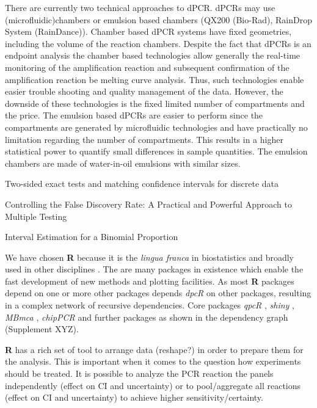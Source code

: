 \documentclass[a4,center,fleqn]{NAR}
\begin{document}
There are currently two technical approaches to dPCR. dPCRs may use		%
(microfluidic)chambers or emulsion based chambers 
(QX200 \texttrademark (Bio-Rad), RainDrop \texttrademark System (RainDance)). 
Chamber based dPCR systems have fixed geometries, including the volume of the 
reaction chambers. Despite the fact that dPCRs is an endpoint analysis the 
chamber based technologies allow generally the real-time monitoring of the 
amplification reaction and subsequent confirmation of the amplification reaction 
be melting curve analysis. Thus, such technologies enable easier trouble 
shooting and quality management of the data. However, the downside of these 
technologies is the fixed limited number of compartments and the price. The 
emulsion based dPCRs are easier to perform since the compartments are generated 
by microfluidic technologies and have practically no limitation regarding the 
number of compartments. This results in a higher statistical power to quantify 
small differences in sample quantities. The emulsion chambers are made of 
water-in-oil emulsions with similar sizes.


Two-sided exact tests and matching confidence intervals for discrete data \cite{fay_2010}

Controlling the False Discovery Rate: A Practical and Powerful Approach to Multiple Testing \cite{benjamini_1995}

Interval Estimation for a Binomial Proportion \cite{brown_2001}



We have chosen \textbf{R} because it is the \textit{lingua franca} in 
biostatistics and broadly used in other disciplines \cite{rodiger_r_2015}. The 
are many packages in existence which enable the fast development of new methods 
and plotting facilities. As most \textbf{R} packages depend on one or more other 
packages \cite{ooms_2013} depends \textit{dpcR} on other packages, resulting in 
a complex network of recursive dependencies. Core packages \textit{qpcR} 
\cite{ritz_qpcr_2008}, \textit{shiny} \cite{shiny}, \textit{MBmca} 
\cite{rodiger_surface_2013}, \textit{chipPCR} \cite{rodiger_chippcr_2015} and 
further packages as shown in the dependency graph (Supplement XYZ).

 

\textbf{R} has a rich set of tool to arrange data (reshape?) in order to prepare them for 
the analysis. This is important when it comes to the question how experiments 
should be treated. It is possible to analyze the PCR reaction the panels 
independently (effect on CI and uncertainty) or to pool/aggregate all reactions 
(effect on CI and uncertainty) to achieve higher sensitivity/certainty.
\end{document}

